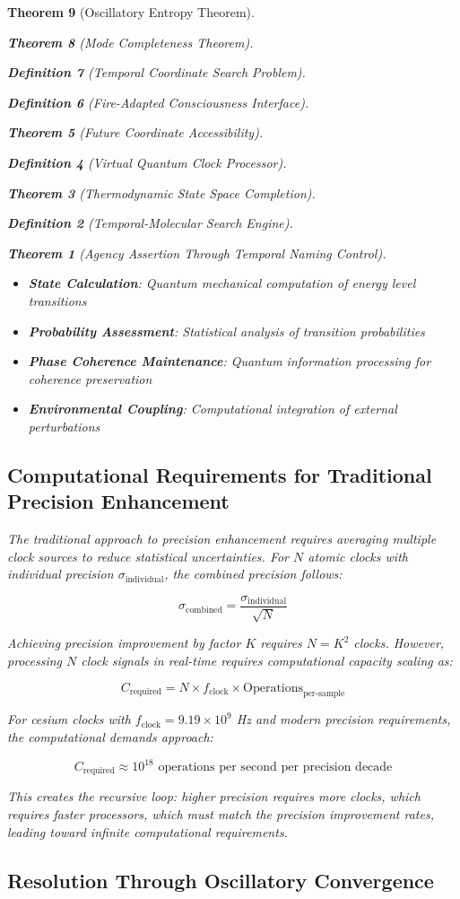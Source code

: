 \documentclass[12pt,a4paper]{article}
\newtheorem{theorem}{Theorem}[section]
\newtheorem{definition}[theorem]{Definition}
\begin{document}
\begin{theorem}[Oscillatory Entropy Theorem]
\begin{theorem}[Mode Completeness Theorem]
\begin{enumerate}
\begin{definition}[Temporal Coordinate Search Problem]
\begin{algorithm}
\begin{definition}[Fire-Adapted Consciousness Interface]
\begin{theorem}[Future Coordinate Accessibility]
\begin{definition}[Virtual Quantum Clock Processor]
\begin{itemize}
\begin{itemize}
\begin{theorem}[Thermodynamic State Space Completion]
\begin{definition}[Temporal-Molecular Search Engine]
\begin{theorem}[Agency Assertion Through Temporal Naming Control]
\begin{remark}
\begin{itemize}
\item \textbf{State Calculation}: Quantum mechanical computation of energy level transitions
\item \textbf{Probability Assessment}: Statistical analysis of transition probabilities
\item \textbf{Phase Coherence Maintenance}: Quantum information processing for coherence preservation
\item \textbf{Environmental Coupling}: Computational integration of external perturbations
\end{itemize}

\subsection{Computational Requirements for Traditional Precision Enhancement}

The traditional approach to precision enhancement requires averaging multiple clock sources to reduce statistical uncertainties. For $N$ atomic clocks with individual precision $\sigma_{\text{individual}}$, the combined precision follows:

$$\sigma_{\text{combined}} = \frac{\sigma_{\text{individual}}}{\sqrt{N}}$$

Achieving precision improvement by factor $K$ requires $N = K^2$ clocks. However, processing $N$ clock signals in real-time requires computational capacity scaling as:

$$C_{\text{required}} = N \times f_{\text{clock}} \times \text{Operations}_{\text{per-sample}}$$

For cesium clocks with $f_{\text{clock}} = 9.19 \times 10^9$ Hz and modern precision requirements, the computational demands approach:

$$C_{\text{required}} \approx 10^{18} \text{ operations per second per precision decade}$$

This creates the recursive loop: higher precision requires more clocks, which requires faster processors, which must match the precision improvement rates, leading toward infinite computational requirements.

\subsection{Resolution Through Oscillatory Convergence}


\end{remark}
\end{theorem}
\end{definition}
\end{theorem}
\end{itemize}
\end{itemize}
\end{definition}
\end{theorem}
\end{definition}
\end{algorithm}
\end{definition}
\end{enumerate}
\end{theorem}
\end{theorem}
\end{document}
